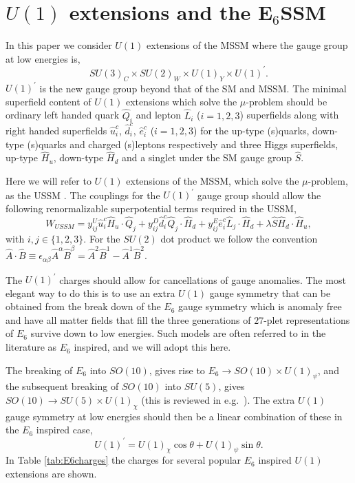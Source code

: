 \documentclass[preprint,amsmath,amssymb,aps,superscriptaddress,prd,
showpacs,floatfix,nofootinbib]{revtex4-1}
\newcommand{\be}{\begin{equation}}
\newcommand{\ee}{\end{equation}}
\begin{document}
\section{\label{sec:model}$U(1)$ extensions and the
E$_6$SSM}

In this paper we consider $U(1)$ extensions of the MSSM where the gauge
group at low energies is, \be SU(3)_C\times SU(2)_W\times U(1)_Y\times
U(1)^\prime.  \ee $U(1)^\prime$ is the new gauge group beyond
that of the SM and MSSM.  The minimal superfield content of $U(1)$
extensions which solve the $\mu$-problem should be ordinary left
handed quark $\hat{Q}_i$ and lepton $\hat{L}_i$
($i=1,2,3$) superfields along with right handed superfields
$\hat{u}^c_i$, $\hat{d}^c_i$, $\hat{e}^c_i$ ($i=1,2,3$) for the
up-type (s)quarks, down-type (s)quarks and charged (s)leptons
respectively and three Higgs superfields, up-type $\hat{H}_u$,
down-type $\hat{H}_d$ and a singlet under the SM gauge group
$\hat{S}$.

Here we will refer to $U(1)$ extensions of the MSSM, which solve the
$\mu$-problem, as the USSM \cite{Cvetic:1995rj, Jain:1995cb,
  Nir:1995bu, Cvetic:1996mf, Cvetic:1997ky}.  The couplings for the
$U(1)^\prime$ gauge group should allow the following renormalizable
superpotential terms required in the USSM,
\begin{equation}
 W_{USSM} = y^U_{ij} \hat{u}^c_i \hat{H}_u \cdot \hat{Q}_j + y^D_{ij}
\hat{d}^c_i \hat{Q}_j \cdot \hat{H}_d + y^E_{ij} \hat{e}^c_i \hat{L}_j
\cdot \hat{H}_d + \lambda \hat{S} \hat{H}_d \cdot \hat{H}_u ,
\end{equation}
with $i,j \in \{1,2,3\}$.  For the $SU(2)$ dot product we follow the
convention $\hat{A} \cdot \hat{B} \equiv \epsilon_{\alpha \beta}
\hat{A}^\alpha \hat{B}^\beta = \hat{A}^2 \hat{B}^1 - \hat{A}^1 \hat{B}^2$.

The $U(1)^\prime$ charges should allow for cancellations of gauge
anomalies.  The most elegant way to do this is to use an extra $U(1)$
gauge symmetry that can be obtained from the break down of the $E_6$
gauge symmetry which is anomaly free and have all matter fields that fill the
three generations of $27$-plet representations of $E_6$ survive down to
low energies.  Such models are often referred to in the literature as
$E_6$ inspired, and we will adopt this here.

The breaking of $E_6$ into $SO(10)$, gives rise to $E_6 \to
SO(10) \times U(1)_{\psi}$, and the subsequent breaking of $SO(10)$
into $SU(5)$, gives $SO(10) \to SU(5) \times U(1)_{\chi}$ (this is
reviewed in e.g.~\cite{Langacker:2008yv}).  The extra $U(1)$ gauge
symmetry at low energies should then be a linear combination of these
in the $E_6$ inspired case, \be U(1)^\prime = U(1)_{\chi} \cos\theta
+ U(1)_{\psi} \sin\theta .  \ee In Table \ref{tab:E6charges} the
charges for several popular $E_6$ inspired $U(1)$ extensions are
shown.
\end{document}
